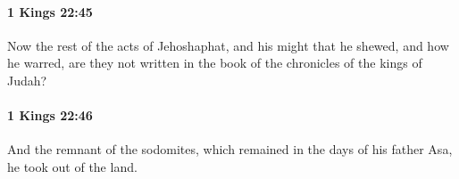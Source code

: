		\paragraph{1 Kings 22:45} %
			\label{1KINGS-22-45}

			Now the rest of the acts of Jehoshaphat, and his might that he shewed, and how he warred, are they not written in the book of the chronicles of the kings of Judah?


		\paragraph{1 Kings 22:46} %
			\label{1KINGS-22-46}

			And the remnant of the sodomites, which remained in the days of his father Asa, he took out of the land.



